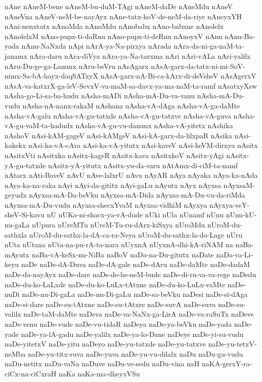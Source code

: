 {nAne
nAneM-bene
nAneM-bu-duM-TAgi
nAneM-daDe
nAneMdu
nAneV
nAneVna
nAneV-neM-be-nayAyx
nAne-tatx-hoV-de-neM-da-riye
nAneyxYH
nAni-nenxtatx
nAnoMda
nAnoMdu
nAnobabx
nAno-babxne
nAnolelx
nAnolelxM
nAno-pupx-ti-daRnu
nAno-pupx-ti-deRnu
nAnoyxV
nAnu
nAnu-Ba-yada
nAnu-NaNxda
nApi
nArA-ya-Na-pirxya
nArada
nAra-da-ni-ga-naM-ta-janamx
nAra-daru
nAra-diVya
nAra-ya-Na-tarxma
nAri
nAri-vALa
nAri-yalilx
nAru-Du-ge-ga-Lanunx
nAru-beVru
nAsAgarx
nAsA-garx-da-tatx-ni-mi-SoV-nimx-Sa-bA-hayx-daqSATxyX
nAsA-garx-nA-Bi-ca-kArx-di-deVsheV
nAsAgerxV
nAsA-va-katxrX-ga-leV-SevxV-va-maM-sa-davx-ya-ma-naM-ta-ramf
nAsatxyXsw
nAsha-go-Li-sa-ba-hudu
nAsha-mADi
nAsha-mA-Du-va-vanu
nAsha-mA-Du-vudu
nAsha-nA-nanx-rakaM
nAshana
nAsha-vA-dAga
nAsha-vA-ga-daMte
nAsha-vA-galu
nAsha-vA-gu-tatxde
nAsha-vA-gu-tatxve
nAsha-vA-guva
nAsha-vA-gu-vaM-ta-hadudx
nAsha-vA-gu-vu-danunx
nAsha-vA-yitetx
nAshika
nAshoV
nAsi-kAM-gageV
nAsi-kAMgeV
nAsi-kA-garx-da-lilxpaR
nAsika
nAsi-kakekx
nAsi-ka-vA-cAra
nAsi-ka-vA-yitutx
nAsi-kaveV
nAsi-keVM-dirxya
nAsitx
nAsitxVti
nAsitxka
nAsitx-kageR
nAsitx-kava
nAsitxkoV
nAsitx-yAgi
nAsitx-yA-gu-tatxde
nAsitx-yA-yitutx
nAsitx-yu-da-varu
nAtAmx-di-ciM-ta-namf
nAtarx
nAti-BaveV
nAvU
nAve-lalxrU
nAvu
nAyAR
nAya
nAyaka
nAya-ka-nAda
nAya-ka-na-raka
nAyi
nAyi-da-gititx
nAyi-gaLu
nAyutx
nAyx
nAyxsa
nAyxsaM-geyudx
nAyxsa-mA-Da-beVku
nAyxsa-mA-Dida
nAyxsa-mA-Du-vu-da-riMda
nAyxsa-mA-Du-vudu
nAyxsa-shecxYvaM
nAyxsa-vidhiM
nAyxya
nAyxya-veY-sheV-Si-kavu
nU
nUKa-ni-shacx-ya-vA-dude
nUki
nUla
nUnamf
nUnu
nUnu-kU-nu-gaLa
nUpura
nUreMTu
nUreM-Tu-ru-dArx-kiSxya
nUroMdu
nUroM-du-sathxla
nUroM-du-sathx-la-dA-ca-ra-Neya
nUroM-du-sathx-la-do-Lage
nUru
nUta
nUtana
nUta-na-pu-rA-ta-nara
nUyxnA
nUyxnA-dhi-kA-riNAM
na
naBa-mAyutx
naBa-vA-keSx-nu-NiBa
naBoV
naDa-na-Du-gitutx
naDate
naDa-va-Li-keyu
naDe
naDe-dA-Duva
naDe-dA-gale
naDe-dAru
naDe-daMte
naDe-dadaM
naDe-da-nayAyx
naDe-dare
naDe-de-he-neM-bude
naDe-di-ru-va-va-rege
naDedu
naDe-du-ko-LaLxde
naDe-du-ko-LuLx-tAtxne
naDe-du-ko-LuLx-vaMte
naDe-nuDi
naDe-nu-Di-gaLa
naDe-nu-Di-gaLu
naDe-sa-beVku
naDesi
naDe-si-dAga
naDe-si-dare
naDe-su-tAtxne
naDe-su-tAtxre
naDe-suvA
naDe-suva
naDe-su-valilx
naDe-taM-daMte
naDeva
naDe-va-NaNx-ga-LirA
naDe-va-raSuTx
naDeve
naDe-venu
naDe-vude
naDe-vu-tidaR
naDeya
naDe-ya-beVku
naDe-yada
naDe-yade
naDe-ya-lA-gadu
naDe-yalilx
naDe-ya-lo-Dane
naDeye
naDe-yi-su-vudu
naDe-yitetxV
naDe-yitu
naDeyo
naDe-yu-tatxde
naDe-yu-tatxve
naDe-yu-tetxV-neMba
naDe-yu-titx-ruva
naDe-yuva
naDe-yu-vu-dilalx
naDu
naDu-gu-vudu
naDu-netitx
naDu-vaNa
naDuve
naDu-ve-sedu
naDu-vina
naH
naKA-gerxY-ra-ciCx-na-ciCxraH
naKa
naKa-ma-dheyxVSu
}

